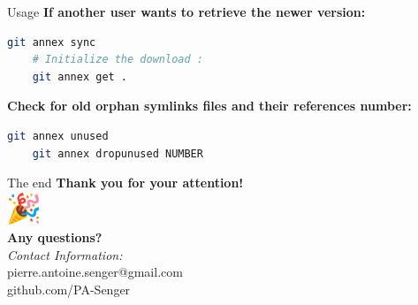 \begin{frame}[fragile]{Usage}
  \textbf{If another user wants to retrieve the newer version:}
  \begin{lstlisting}[language=bash]
    git annex sync
    # Initialize the download :
    git annex get .
  \end{lstlisting}
  \textbf{Check for old orphan symlinks files and their references number:}
  \begin{lstlisting}[language=bash]
    git annex unused
    git annex dropunused NUMBER
    \end{lstlisting}
\end{frame}

\begin{frame}{The end}
  \Large
  \centering
  \textbf{Thank you for your attention!} \\
  \vspace{1em}
  \includegraphics[height=1cm]{party-emoji.png} \\
  \vspace{1em}
  \textbf{Any questions?} \\
  \vspace{2em}
  \small
  \textit{Contact Information:} \\
  pierre.antoine.senger@gmail.com \\
  github.com/PA-Senger
\end{frame}

\printbibliography
